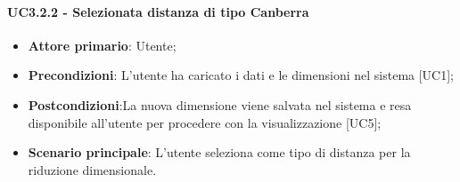 \paragraph{UC3.2.2 - Selezionata distanza di tipo Canberra}
\begin{itemize}
	\item \textbf{Attore primario}: Utente;
	\item \textbf{Precondizioni}: L'utente ha caricato i dati e le dimensioni nel sistema [UC1];
	\item \textbf{Postcondizioni}:La nuova dimensione viene salvata nel sistema e resa disponibile all'utente per procedere con la visualizzazione [UC5];
	\item \textbf{Scenario principale}: L'utente seleziona  come tipo di distanza per la riduzione dimensionale.

\end{itemize}